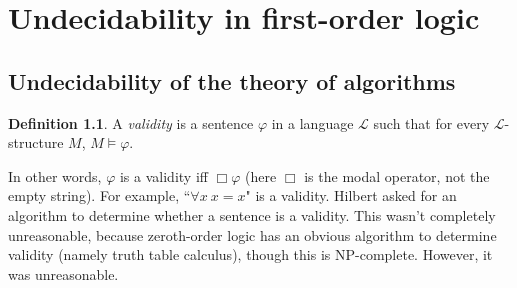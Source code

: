 \documentclass[12pt]{report}
\newcommand{\dfn}[1]{\emph{#1}\index{#1}}
\theoremstyle{definition}
\newtheorem{definition}[theorem]{Definition}
\begin{document}
\chapter{Undecidability in first-order logic}
\section{Undecidability of the theory of algorithms}
\begin{definition}
A \dfn{validity} is a sentence $\varphi$ in a language $\mathcal L$ such that for every $\mathcal L$-structure $M$, $M \models \varphi$.
\end{definition}
In other words, $\varphi$ is a validity iff $\Box \varphi$ (here $\Box$ is the modal operator, not the empty string). For example, ``$\forall x ~x = x$" is a validity. Hilbert asked for an algorithm to determine whether a sentence is a validity. This wasn't completely unreasonable, because zeroth-order logic has an obvious algorithm to determine validity (namely truth table calculus), though this is NP-complete. However, it was unreasonable.
\end{document}
